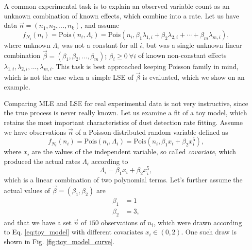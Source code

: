 A common experimental task is to explain an observed variable count as an unknown combination of known effects, which combine into a rate. Let us have data $\vec{n} = (n_1, n_2, \dots , n_k)$, and assume
\begin{equation}
    f_{N_i}(n_i) = \mathrm{Pois}(n_i,\Lambda_i) = \mathrm{Pois}(n_i,\beta_1 \lambda_{1,i} + \beta_2 \lambda_{2,i} + \cdots + \beta_m \lambda_{m,i}), \label{eq:linear_comination_model}
\end{equation}
where unknown $\Lambda_i$ was not a constant for all $i$, but was a single unknown linear combination $\vec{\beta} = (\beta_1, \beta_2, \dots, \beta_m); \ \beta_i \geq 0 \ \forall i$ of known non-constant effects $\lambda_{1,i}, \lambda_{2,i}, \dots, \lambda_{m,i}$. This task is best approached keeping Poisson family in mind, which is not the case when a simple LSE of $\vec{\beta}$ is evaluated, which we show on an example. 

Comparing MLE and LSE for real experimental data is not very instructive, since the true process is never really known. Let us examine a fit of a toy model, which retains the most important characteristics of dust detection rate fitting. Assume we have observations $\vec{n}$ of a Poisson-distributed random variable defined as
\begin{equation}
    f_{N_i}(n_i) = \mathrm{Pois}(n_i,\Lambda_i) = \mathrm{Pois}(n_i,\beta_1 x_i + \beta_2 x_i^5), \label{eq:toy_model}
\end{equation}
where $x_i$ are the values of the independent variable, so called \textit{covariate}, which produced the actual rates $\Lambda_i$ according to
\begin{equation}
    \Lambda_i = \beta_1 x_i + \beta_2 x_i^5, \label{eq:toy_model_rate}
\end{equation}
which is a linear combination of two polynomial terms. Let's further assume the actual values of $\vec{\beta} = (\beta_1,\beta_2)$ are
\begin{equation}\begin{split}
    \beta_1 &= 1 \\
    \beta_2 &= 3, \label{eq:toy_beta_values}
\end{split}\end{equation}
and that we have a set $\vec{n}$ of $150$ observations of $n_i$, which were drawn according to Eq. \ref{eq:toy_model} with different covariates $x_i\in(0,2)$. One such draw is shown in Fig. \ref{fig:toy_model_curve}. 

